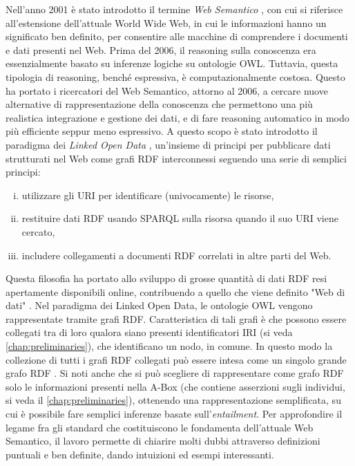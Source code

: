 Nell'anno 2001 è stato introdotto il termine \emph{Web Semantico} \cite{berners2001semantic}, con cui si riferisce all'estensione dell'attuale World Wide Web, in cui le informazioni hanno un significato ben definito, per consentire alle macchine di comprendere i documenti e dati presenti nel Web. Prima del 2006, il reasoning sulla conoscenza era essenzialmente basato su inferenze logiche su ontologie OWL. Tuttavia, questa tipologia di reasoning, benché espressiva, è computazionalmente costosa. Questo ha portato i ricercatori del Web Semantico, attorno al 2006, a cercare nuove alternative di rappresentazione della conoscenza che permettono una più realistica integrazione e gestione dei dati, e di fare reasoning automatico in modo più efficiente seppur meno espressivo. A questo scopo è stato introdotto il paradigma dei \textit{Linked Open Data} \cite{hitzler2021review}, un'insieme di principi per pubblicare dati strutturati nel Web come grafi RDF interconnessi seguendo una serie di semplici principi: 
\begin{enumerate}[(i)]
	\item utilizzare gli URI per identificare (univocamente) le risorse,
	\item restituire dati RDF usando SPARQL sulla risorsa quando il suo URI viene cercato, 
	\item includere collegamenti a documenti RDF correlati in altre parti del Web.
\end{enumerate}
Questa filosofia ha portato allo sviluppo di grosse quantità di dati RDF resi apertamente disponibili online, contribuendo a quello che viene definito "Web di dati" \cite{polleres2013reasoningLOD}. Nel paradigma dei Linked Open Data, le ontologie OWL vengono rappresentate tramite grafi RDF. Caratteristica di tali grafi è che possono essere collegati tra di loro qualora siano presenti identificatori IRI (si veda \autoref{chap:preliminaries}), che identificano un nodo, in comune. In questo modo la collezione di tutti i grafi RDF collegati può essere intesa come un singolo grande grafo RDF \cite{polleres2013reasoningLOD}. Si noti anche che si può scegliere di rappresentare come grafo RDF solo le informazioni presenti nella A-Box (che contiene asserzioni sugli individui, si veda il \autoref{chap:preliminaries}), ottenendo una rappresentazione semplificata, su cui è possibile fare semplici inferenze basate sull'\emph{entailment}. Per approfondire il legame fra gli standard che costituiscono le fondamenta dell'attuale Web Semantico, il lavoro \cite{polleres2013reasoningLOD} permette di chiarire molti dubbi attraverso definizioni puntuali e ben definite, dando intuizioni ed esempi interessanti.

